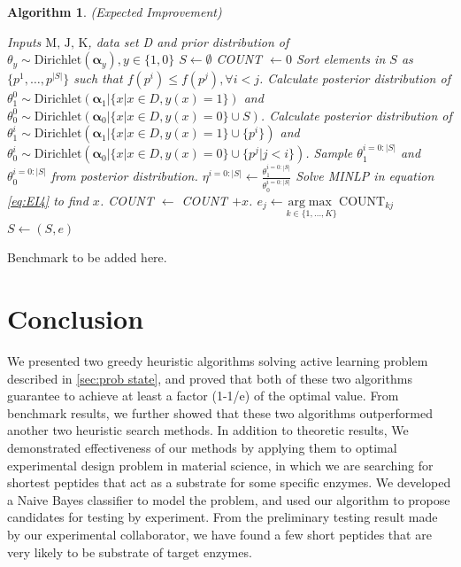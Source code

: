 \documentclass[11pt]{article}
\newtheorem{algo}{Algorithm}
\begin{document}
\begin{algo}(Expected Improvement) \label{algo2}\\
\begin{algorithmic}[1]
\REQUIRE Inputs $\text{M, J, K}$, data set D and prior distribution of $\theta_y \sim \text{Dirichlet} (\boldsymbol \alpha_y), y \in \{1,0\}$
\STATE $S \leftarrow \emptyset $
\STATE COUNT $\leftarrow 0$
\STATE Sort elements in $S$ as $\{p^1,\ldots,p^{|S|}\}$ such that $f(p^i) \leq f(p^j), \forall i<j$.
\ENDIF
\STATE Calculate posterior distribution of $\theta_1^0 \sim \text{Dirichlet} (\boldsymbol \alpha_1|\{x|x \in D,y(x)=1\})$ and $\theta_0^0 \sim \text{Dirichlet} (\boldsymbol \alpha_0|\{x|x \in D,y(x)=0\} \cup S)$.
\STATE Calculate posterior distribution of $\theta_1^i \sim \text{Dirichlet} (\boldsymbol \alpha_1|\{x|x \in D,y(x)=1\} \cup \{p^i\})$ and $\theta_0^i \sim \text{Dirichlet} (\boldsymbol \alpha_0|\{x|x \in D,y(x)=0\} \cup \{p^j|j<i\})$.
\ENDFOR
\LOOP 
\STATE Sample $\theta_1^{i=0:|S|}$ and $\theta_0^{i=0:|S|}$ from posterior distribution.
\STATE $\eta^{i=0:|S|} \leftarrow \frac{\theta_1^{i=0:|S|}}{\theta_0^{i=0:|S|}}$
\STATE Solve MINLP in equation \eqref{eq:EI4} to find $x$.
\STATE COUNT $\leftarrow$ COUNT $+ x$.
\ENDLOOP
{}
\STATE $e_j \leftarrow \underset{k \in \{1,\ldots,K\}}{\mathrm{arg}\max} \, \text{COUNT}_{kj}$
\ENDFOR
\STATE $S \leftarrow (S, e)$
\ENDFOR
\end{algorithmic}
\end{algo}
Benchmark to be added here.

\section{Conclusion}
We presented two greedy heuristic algorithms solving active learning problem described in \ref{sec:prob state}, and proved that both of these two algorithms guarantee to achieve at least a factor (1-1/e) of the optimal value. From benchmark results, we further showed that these two algorithms outperformed another two heuristic search methods. In addition to theoretic results, We demonstrated effectiveness of our methods by applying them to optimal experimental design problem in material science, in which we are searching for shortest peptides that act as a substrate for some specific enzymes. We developed a Naive Bayes classifier to model the problem, and used our algorithm to propose candidates for testing by experiment. From the preliminary testing result made by our experimental collaborator, we have found a few short peptides that are very likely to be substrate of target enzymes.



\end{document}
